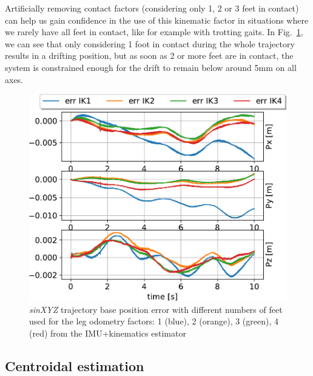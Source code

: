 Artificially removing contact factors (considering only 1, 2 or 3 feet in contact) can help us gain confidence in the use of this kinematic factor in situations where we rarely have all feet in contact, like for example with trotting gaits. In Fig.~\ref{fig:ErrIKn}, we can see that only considering 1 foot in contact during the whole trajectory results in a drifting position, but as soon as 2 or more feet are in contact, the system is constrained enough for the drift to remain below around 5mm on all axes. 
%
\begin{figure}[t]
    \centering
    \includegraphics[height=0.6\columnwidth]{figures/centroidal/base_position_err_IKn.pdf}
    \caption{\textit{sinXYZ} trajectory base position error with different numbers of feet used for the leg odometry factors: 1 (blue), 2 (orange), 3 (green), 4 (red) from the IMU+kinematics estimator}
    \label{fig:ErrIKn}
\end{figure}
%

\subsection{Centroidal estimation}

